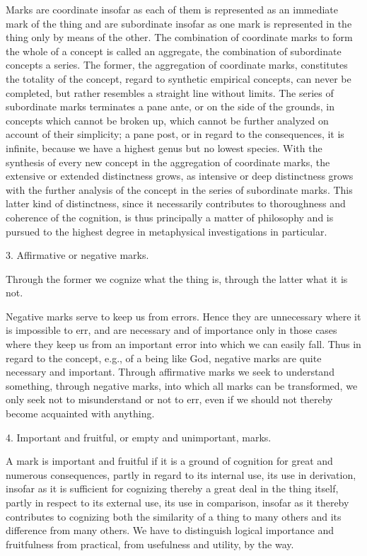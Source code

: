 Marks are coordinate insofar as each of them is
represented as an immediate mark of the thing
and are subordinate insofar as one mark is
represented in the thing only by means of the other.
The combination of coordinate marks to form
the whole of a concept is called an aggregate,
the combination of subordinate concepts a series.
The former, the aggregation of coordinate marks,
constitutes the totality of the concept,
regard to synthetic empirical concepts, can never be completed,
but rather resembles a straight line without limits.
The series of subordinate marks terminates a pane ante,
or on the side of the grounds, in concepts which cannot be broken up,
which cannot be further analyzed on account of their simplicity;
a pane post, or in regard to the consequences, it is infinite,
because we have a highest genus but no lowest species.
With the synthesis of every new concept in the aggregation of coordinate marks,
the extensive or extended distinctness grows,
as intensive or deep distinctness grows with the further
analysis of the concept in the series of subordinate marks.
This latter kind of distinctness, since it necessarily
contributes to thoroughness and coherence of the cognition,
is thus principally a matter of philosophy and is pursued
to the highest degree in metaphysical investigations in particular.

3. Affirmative or negative marks.

Through the former we cognize what the thing is,
through the latter what it is not.

Negative marks serve to keep us from errors.
Hence they are unnecessary where it is impossible to err,
and are necessary and of importance only in
those cases where they keep us from an important error
into which we can easily fall.
Thus in regard to the concept, e.g., of a being like God,
negative marks are quite necessary and important.
Through affirmative marks we seek to understand something,
through negative marks, into which all marks can be transformed,
we only seek not to misunderstand or not to err,
even if we should not thereby become acquainted with anything.

4. Important and fruitful, or empty and unimportant, marks.

A mark is important and fruitful if it is a ground of cognition for great
and numerous consequences, partly in regard to its internal use, its use in
derivation, insofar as it is sufficient for cognizing thereby a great deal in
the thing itself, partly in respect to its external use, its use in comparison,
insofar as it thereby contributes to cognizing both the similarity of a thing
to many others and its difference from many others.
We have to distinguish logical importance and fruitfulness from practical,
from usefulness and utility, by the way.

